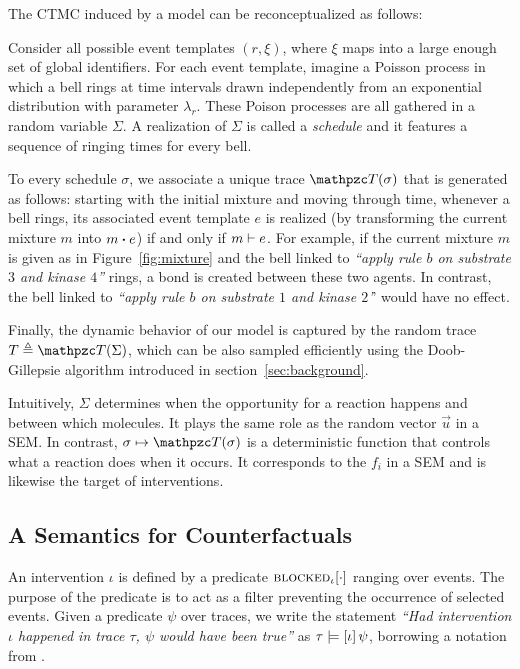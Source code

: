 The CTMC induced by a model can be reconceptualized as follows:
\begin{inparaenum}[(i)]
\item Consider all possible event templates $(r, \xi)$, where $\xi$
  maps into a large enough set of global identifiers. For each event
  template, imagine a Poisson process in which a bell rings at time
  intervals drawn independently from an exponential distribution with
  parameter $\lambda_r$. These Poison processes are all gathered in a
  random variable $\Sigma$. A realization of $\Sigma$ is called
  a \emph{schedule} and it features a sequence of ringing times
  for every bell.
\item To every schedule $\sigma$, we associate a unique trace
  $\DetTrace(\sigma)$ that is generated as follows: starting with the
  initial mixture and moving through time, whenever a bell rings, its
  associated event template $e$ is realized (by transforming the
  current mixture $m$ into $\UPDATE{m}{e}$) if and only if
  $m \vdash e$. For example, if the current mixture $m$ is
  given as in Figure~\ref{fig:mixture} and the bell linked to
  \textit{``apply rule $b$ on substrate $3$ and kinase $4$''} rings, a
  bond is created between these two agents. In contrast, the bell
  linked to \textit{``apply rule $b$ on substrate $1$ and kinase
    $2$'}' would have no effect.
\item Finally, the dynamic behavior of our model is captured by the random
  trace $T \eqdef \DetTrace(\Sigma)$, which can be also sampled
  efficiently using the Doob-Gillepsie algorithm introduced in
  section~\ref{sec:background}.
\end{inparaenum}

Intuitively, $\Sigma$ determines when the opportunity for a reaction
happens and between which molecules. It plays the same role as the
random vector $\vec u$ in a SEM. In contrast,
$\sigma \mapsto \DetTrace(\sigma)$ is a deterministic function that
controls what a reaction does when it occurs.  It corresponds to the
$f_i$ in a SEM and is likewise the target of interventions.


\subsection{A Semantics for Counterfactuals}
\label{subsec:counterfactuals-semantics}

An intervention $\iota$ is defined by a predicate
${\textsc{blocked}}_{\iota}[\cdot]$ ranging over events. The purpose of the
predicate is to act as a filter preventing the occurrence of selected
events. Given a predicate $\psi$ over traces, we write the statement
\textit{``Had intervention $\iota$ happened in trace $\tau$, $\psi$
  would have been true''} as $\tau \models [\iota] \, \psi{}$, borrowing a notation from
\cite{halpern2016actual}.

